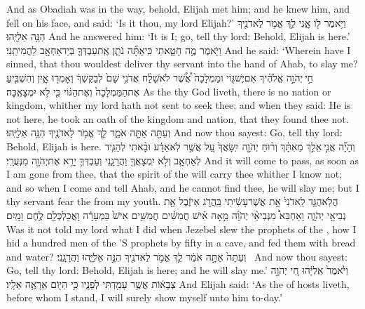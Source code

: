 {And as Obadiah was in the way, behold, Elijah met him; and he knew him, and fell on his face, and said: ‘Is it thou, my lord Elijah?’}
{וַיֹּ֥אמֶר ל֖וֹ אָ֑נִי לֵ֛ךְ אֱמֹ֥ר לַאדֹנֶ֖יךָ הִנֵּ֥ה אֵלִיָּֽהוּ׃}
{And he answered him: ‘It is I; go, tell thy lord: Behold, Elijah is here.’}
{וַיֹּ֖אמֶר מֶ֣ה חָטָ֑אתִי כִּֽי\maqqaf אַתָּ֞ה נֹתֵ֧ן אֶֽת\maqqaf עַבְדְּךָ֛ בְּיַד\maqqaf אַחְאָ֖ב לַהֲמִיתֵֽנִי׃}
{And he said: ‘Wherein have I sinned, that thou wouldest deliver thy servant into the hand of Ahab, to slay me?}
{חַ֣י \legarmeh  יְהֹוָ֣ה אֱלֹהֶ֗יךָ אִם\maqqaf יֶשׁ\maqqaf גּ֤וֹי וּמַמְלָכָה֙ אֲ֠שֶׁ֠ר לֹא\maqqaf שָׁלַ֨ח אֲדֹנִ֥י שָׁם֙ לְבַקֶּשְׁךָ֔ וְאָמְר֖וּ אָ֑יִן וְהִשְׁבִּ֤יעַ אֶת\maqqaf הַמַּמְלָכָה֙ וְאֶת\maqqaf הַגּ֔וֹי כִּ֖י לֹ֥א יִמְצָאֶֽכָּה׃}
{As the \lord\space thy God liveth, there is no nation or kingdom, whither my lord hath not sent to seek thee; and when they said: He is not here, he took an oath of the kingdom and nation, that they found thee not.}
{וְעַתָּ֖ה אַתָּ֣ה אֹמֵ֑ר לֵ֛ךְ אֱמֹ֥ר לַאדֹנֶ֖יךָ הִנֵּ֥ה אֵלִיָּֽהוּ׃}
{And now thou sayest: Go, tell thy lord: Behold, Elijah is here.}
{וְהָיָ֞ה אֲנִ֣י \legarmeh  אֵלֵ֣ךְ מֵאִתָּ֗ךְ וְר֨וּחַ יְהֹוָ֤ה \pasek  יִֽשָּׂאֲךָ֙ עַ֚ל אֲשֶׁ֣ר לֹֽא\maqqaf אֵדָ֔ע וּבָ֨אתִי לְהַגִּ֧יד לְאַחְאָ֛ב וְלֹ֥א יִֽמְצָאֲךָ֖ וַהֲרָגָ֑נִי וְעַבְדְּךָ֛ יָרֵ֥א אֶת\maqqaf יְהֹוָ֖ה מִנְּעֻרָֽי׃}
{And it will come to pass, as soon as I am gone from thee, that the spirit of the \lord\space will carry thee whither I know not; and so when I come and tell Ahab, and he cannot find thee, he will slay me; but I thy servant fear the \lord\space from my youth.}
{הֲלֹֽא\maqqaf הֻגַּ֤ד לַֽאדֹנִי֙ אֵ֣ת אֲשֶׁר\maqqaf עָשִׂ֔יתִי בַּֽהֲרֹ֣ג אִיזֶ֔בֶל אֵ֖ת נְבִיאֵ֣י יְהֹוָ֑ה וָאַחְבִּא֩ מִנְּבִיאֵ֨י יְהֹוָ֜ה מֵ֣אָה אִ֗ישׁ חֲמִשִּׁ֨ים חֲמִשִּׁ֥ים אִישׁ֙ בַּמְּעָרָ֔ה וָאֲכַלְכְּלֵ֖ם לֶ֥חֶם וָמָֽיִם׃}
{Was it not told my lord what I did when Jezebel slew the prophets of the \lord, how I hid a hundred men of the \lord’S prophets by fifty in a cave, and fed them with bread and water?}
{וְעַתָּה֙ אַתָּ֣ה אֹמֵ֔ר לֵ֛ךְ אֱמֹ֥ר לַאדֹנֶ֖יךָ הִנֵּ֣ה אֵלִיָּ֑הוּ וַהֲרָגָֽנִי׃ \setuma }
{And now thou sayest: Go, tell thy lord: Behold, Elijah is here; and he will slay me.’}
{וַיֹּ֙אמֶר֙ אֵֽלִיָּ֔הוּ חַ֚י יְהֹוָ֣ה צְבָא֔וֹת אֲשֶׁ֥ר עָמַ֖דְתִּי לְפָנָ֑יו כִּ֥י הַיּ֖וֹם אֵרָאֶ֥ה אֵלָֽיו׃}
{And Elijah said: ‘As the \lord\space of hosts liveth, before whom I stand, I will surely show myself unto him to-day.’}
